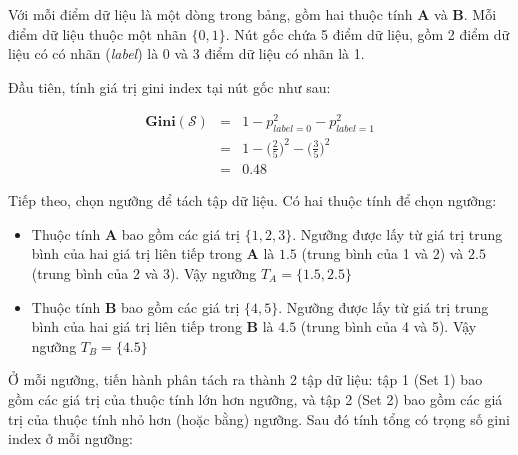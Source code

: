 \documentclass[../main-report.tex]{subfiles}
\begin{document}
Với mỗi điểm dữ liệu là một dòng trong bảng, gồm hai thuộc tính \textbf{A} và \textbf{B}. Mỗi điểm dữ liệu thuộc một nhãn $\{0, 1\}$. Nút gốc chứa 5 điểm dữ liệu, gồm 2 điểm dữ liệu có có nhãn (\emph{label}) là 0 và 3 điểm dữ liệu có nhãn là 1.

Đầu tiên, tính giá trị gini index tại nút gốc như sau:

\begin{eqnarray*}
\mathbf{Gini}(\mathcal{S}) 
& = & 1 - p_{label=0}^{2} - p_{label=1}^{2} \\
& = & 1 - \biggl(\frac{2}{5}\biggr)^2 - \biggl(\frac{3}{5}\biggr)^2 \\
& = & 0.48
\end{eqnarray*}

Tiếp theo, chọn ngưỡng để tách tập dữ liệu. Có hai thuộc tính để chọn ngưỡng:

\begin{itemize}
\item Thuộc tính \textbf{A} bao gồm các giá trị $\{1, 2, 3\}$. Ngưỡng được lấy từ giá trị trung bình của hai giá trị liên tiếp trong \textbf{A} là $1.5$ (trung bình của 1 và 2) và $2.5$ (trung bình của 2 và 3). Vậy ngưỡng $T_A = \{1.5, 2.5\}$
\item Thuộc tính \textbf{B} bao gồm các giá trị $\{4, 5\}$. Ngưỡng được lấy từ giá trị trung bình của hai giá trị liên tiếp trong \textbf{B} là $4.5$ (trung bình của 4 và 5). Vậy ngưỡng $T_B = \{4.5\}$
\end{itemize}

Ở mỗi ngưỡng, tiến hành phân tách ra thành 2 tập dữ liệu: tập 1 (Set 1) bao gồm các giá trị của thuộc tính lớn hơn ngưỡng, và tập 2 (Set 2) bao gồm các giá trị của thuộc tính nhỏ hơn (hoặc bằng) ngưỡng. Sau đó tính tổng có trọng số gini index ở mỗi ngưỡng:
\end{document}

